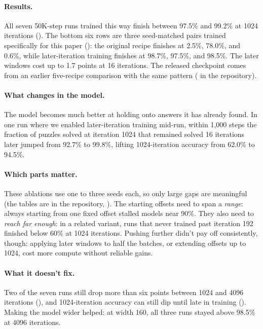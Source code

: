 \paragraph{Results.} All seven 50K-step runs trained this way finish between 97.5\% and 99.2\% at 1024 iterations (). The bottom six rows are three seed-matched pairs trained specifically for this paper (): the original recipe finishes at 2.5\%, 78.0\%, and 0.6\%, while later-iteration training finishes at 98.7\%, 97.5\%, and 98.5\%. The later windows cost up to 1.7 points at 16 iterations. The released checkpoint comes from an earlier five-recipe comparison with the same pattern ( in the repository).

\paragraph{What changes in the model.} The model becomes much better at holding onto answers it has already found. In one run where we enabled later-iteration training mid-run, within 1,000 steps the fraction of puzzles solved at iteration 1024 that remained solved 16 iterations later jumped from 92.7\% to 99.8\%, lifting 1024-iteration accuracy from 62.0\% to 94.5\%.

\paragraph{Which parts matter.} These ablations use one to three seeds each, so only large gaps are meaningful (the tables are in the repository, ). The starting offsets need to span a \emph{range}: always starting from one fixed offset stalled models near 90\%. They also need to \emph{reach far enough}: in a related variant, runs that never trained past iteration 192 finished below 60\% at 1024 iterations. Pushing further didn't pay off consistently, though: applying later windows to half the batches, or extending offsets up to 1024, cost more compute without reliable gains.

\paragraph{What it doesn't fix.} Two of the seven runs still drop more than six points between 1024 and 4096 iterations (), and 1024-iteration accuracy can still dip until late in training (). Making the model wider helped: at width 160, all three runs stayed above 98.5\% at 4096 iterations.

